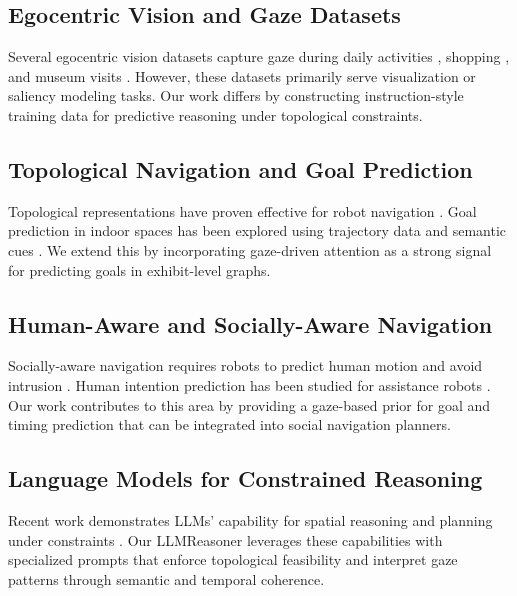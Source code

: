 \documentclass{letterpaper,article}
\begin{document}
\subsection{Egocentric Vision and Gaze Datasets}

Several egocentric vision datasets capture gaze during daily activities \cite{fathi2012learning}, shopping \cite{yan2020gaze}, and museum visits \cite{kitani2012activity}. However, these datasets primarily serve visualization or saliency modeling tasks. Our work differs by constructing instruction-style training data for predictive reasoning under topological constraints.

\subsection{Topological Navigation and Goal Prediction}

Topological representations have proven effective for robot navigation \cite{walter2024learning}. Goal prediction in indoor spaces has been explored using trajectory data \cite{ziebart2019navigate} and semantic cues \cite{kucner2017semantic}. We extend this by incorporating gaze-driven attention as a strong signal for predicting goals in exhibit-level graphs.

\subsection{Human-Aware and Socially-Aware Navigation}

Socially-aware navigation requires robots to predict human motion and avoid intrusion \cite{trautman2010unfreezing, chen2017socially}. Human intention prediction has been studied for assistance robots \cite{pynadath2021plan}. Our work contributes to this area by providing a gaze-based prior for goal and timing prediction that can be integrated into social navigation planners.

\subsection{Language Models for Constrained Reasoning}

Recent work demonstrates LLMs' capability for spatial reasoning \cite{liang2024spatial} and planning under constraints \cite{xia2024chain}. Our LLMReasoner leverages these capabilities with specialized prompts that enforce topological feasibility and interpret gaze patterns through semantic and temporal coherence.
\end{document}
